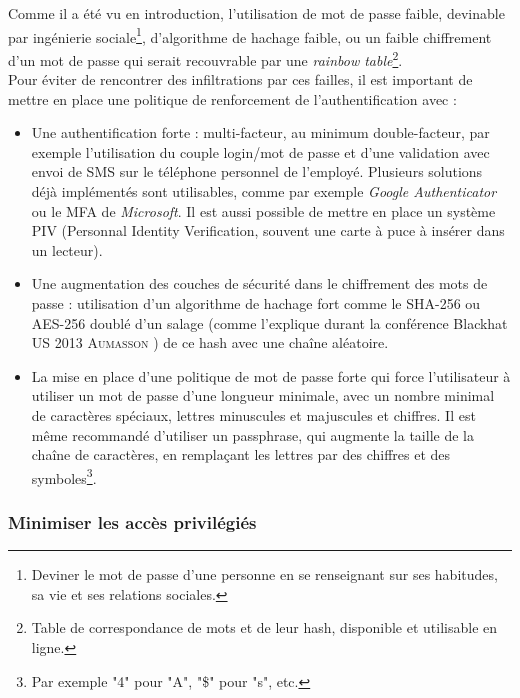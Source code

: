 Comme il a été vu en introduction, l'utilisation de mot de passe faible, devinable par ingénierie sociale\footnote{Deviner le mot de passe d'une personne en se renseignant sur ses habitudes, sa vie et ses relations sociales.}, d'algorithme de hachage faible, ou un faible chiffrement d'un mot de passe qui serait recouvrable par une \emph{rainbow table}\footnote{Table de correspondance de mots et de leur hash, disponible et utilisable en ligne.}.\\
Pour éviter de rencontrer des infiltrations par ces failles, il est important de mettre en place une politique de renforcement de l'authentification avec :
\begin{itemize}
	\item Une authentification forte : multi-facteur, au minimum double-facteur, par exemple l'utilisation du couple login/mot de passe et d'une validation avec envoi de SMS sur le téléphone personnel de l'employé. Plusieurs solutions déjà implémentés sont utilisables, comme par exemple \emph{Google Authenticator} ou le MFA de \emph{Microsoft}. Il est aussi possible de mettre en place un système PIV (Personnal Identity Verification, souvent une carte à puce à insérer dans un lecteur).
	\item Une augmentation des couches de sécurité dans le chiffrement des mots de passe : utilisation d'un algorithme de hachage fort comme le SHA-256 ou AES-256 doublé d'un salage (comme l'explique durant la conférence Blackhat US 2013 \textsc{Aumasson} \cite{jpa}) de ce hash avec une chaîne aléatoire.
	\item La mise en place d'une politique de mot de passe forte qui force l'utilisateur à utiliser un mot de passe d'une longueur minimale, avec un nombre minimal de caractères spéciaux, lettres minuscules et majuscules et chiffres. Il est même recommandé d'utiliser un passphrase, qui augmente la taille de la chaîne de caractères, en remplaçant les lettres par des chiffres et des symboles\footnote{Par exemple "4" pour "A", "\$" pour "s", etc.}.
\end{itemize}

\subsubsection{Minimiser les accès privilégiés}
\label{par:minipriv}

